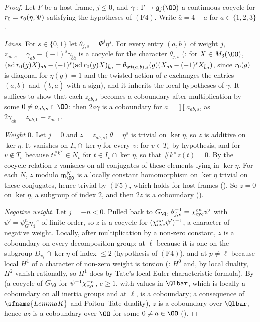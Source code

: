 \begin{proof}
Let $F$ be a host frame, $j\le0$, and $\gamma:\Gamma\to\mathfrak g_j(\OO)$ a continuous cocycle for $r_0=r_0(\eta,\Psi)$ satisfying the hypotheses of
$(\mathrm{F4})$. Write $\bar a=4-a$ for $a\in\{1,2,3\}$.

\emph{Lines.} For $s\in\{0,1\}$ let $\theta_{j,s}=\Psi^j\eta^s$. For every entry $(a,b)$ of weight $j$, $z_{ab,s}=\gamma_{ab}-(-1)^s\gamma_{\bar b\bar a}$ is a
cocycle for the character $\theta_{j,s}$ (: for $X\in M_3(\OO)$,
$(\mathrm{ad}\,r_0(g)X)_{ab}-(-1)^s(\mathrm{ad}\,r_0(g)X)_{\bar b\bar a}=\theta_{\mathrm{wt}(a,b),s}(g)(X_{ab}-(-1)^sX_{\bar b\bar a})$, since $r_0(g)$ is diagonal
for $\eta(g)=1$ and the twisted action of $c$ exchanges the entries $(a,b)$ and $(\bar b,\bar a)$ with a sign), and it inherits the local
hypotheses of $\gamma$. It suffices to show that each $z_{ab,s}$ becomes a coboundary after multiplication by some $0\ne a_{ab,s}\in\OO$: then
$2a\gamma$ is a coboundary for $a=\prod a_{ab,s}$, as $2\gamma_{ab}=z_{ab,0}+z_{ab,1}$.

\emph{Weight $0$.} Let $j=0$ and $z=z_{ab,s}$; $\theta=\eta^s$ is trivial on $\ker\eta$, so $z$ is additive on $\ker\eta$. It vanishes on $I_v\cap\ker\eta$ for
every $v$: for $v\in T_b$ by hypothesis, and for $v\notin T_b$ because $t^{\#k^\times}\in N_v$ for $t\in I_v\cap\ker\eta$, so that $\#k^\times z(t)=0$. By the cocycle
relation $z$ vanishes on all conjugates of these elements lying in $\ker\eta$. For each $N$, $z$ modulo $\mathfrak m_\OO^N$ is a locally constant
homomorphism on $\ker\eta$ trivial on these conjugates, hence trivial by $(\mathrm{F5})$, which holds for host frames
(). So $z=0$ on $\ker\eta$, a subgroup of index $2$, and then $2z$ is a
coboundary ().

\emph{Negative weight.} Let $j=-n<0$. Pulled back to $G_\Q$, $\theta_{j,s}^{-1}=\chi_{\mathrm{cyc}}^{en}\psi'$ with $\psi'=\psi_G^n\eta_4^{-s}$ of finite order, so $z$ is a
cocycle for $(\chi_{\mathrm{cyc}}^{en}\psi')^{-1}$, a character of negative weight. Locally, after multiplication by a non-zero constant, $z$ is a
coboundary on every decomposition group: at $\ell$ because it is one on the subgroup $D_{v_\ell}\cap\ker\eta$ of index $\le2$ (hypothesis of $(\mathrm{F4})$),
and at $p\ne\ell$ because local $H^1$ of a character of non-zero weight is torsion (: $H^0$ and, by
local duality, $H^2$ vanish rationally, so $H^1$ does by Tate's local Euler characteristic formula). By
 (a cocycle of $G_\Q$ for $\psi^{-1}\chi_{\mathrm{cyc}}^{-e}$, $e\ge1$, with values in $\Qlbar$, which is locally a
coboundary on all inertia groups and at $\ell$, is a coboundary; a consequence of $\sfname{LemmaK}$ and Poitou--Tate duality), $z$ is a
coboundary over $\Qlbar$, hence $az$ is a coboundary over $\OO$ for some $0\ne a\in\OO$ ().
\end{proof}

